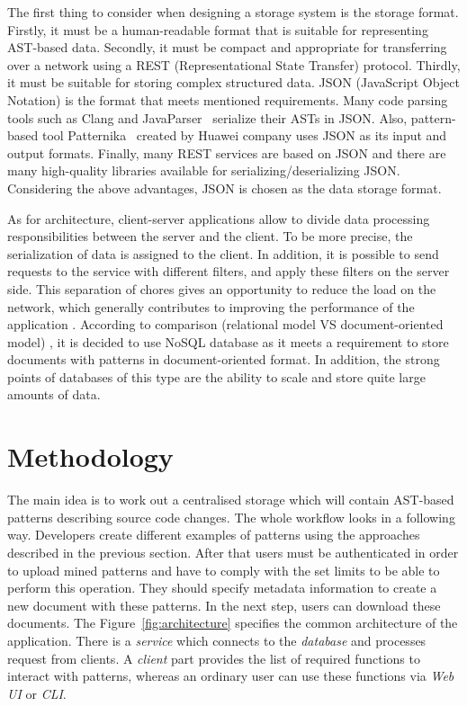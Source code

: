 \documentclass[letterpaper, 10 pt, conference]{ieeeconf}  %
\begin{document}
The first thing to consider when designing a storage system is the storage
format. 
Firstly, it must be a human-readable format that is suitable for
representing AST-based data. 
Secondly, it must be compact and appropriate for transferring over a network 
using a REST (Representational State Transfer) protocol. 
Thirdly, it must be suitable for storing complex structured data.
JSON (JavaScript Object Notation) \cite{c7} is the format that meets mentioned
requirements.
Many code parsing tools such as Clang and JavaParser~\cite{c8} serialize 
their ASTs in JSON. 
Also, pattern-based tool Patternika~\cite{c1} created by Huawei company uses
JSON as its input and output formats.
Finally, many REST services are based on JSON and there are many high-quality
libraries available for serializing/deserializing JSON. 
Considering the above advantages, JSON is chosen as the data storage format.

As for architecture, client-server applications allow to divide data
processing responsibilities between the server and the client. 
To be more precise, the serialization of data is assigned to the client. 
In addition, it is possible to send requests to the service with different
filters, and apply these filters on the server side. 
This separation of chores gives an opportunity to reduce the load on the
network, which generally contributes to improving the performance of the
application \cite{c10}. 
According to comparison (relational model VS document-oriented model)
\cite{c11}, it is decided to use NoSQL database as it meets a requirement 
to store documents with patterns in document-oriented format. 
In addition, the strong points of databases of this type are the ability to
scale and store quite large amounts of data.

\section{Methodology}
\label{section:method}

The main idea is to work out a centralised storage which will contain AST-based
patterns describing source code changes.
The whole workflow looks in a following way.
Developers create different examples of patterns using the approaches described
in the previous section.
After that users must be authenticated in order to upload mined patterns and
have to comply with the set limits to be able to perform this operation.
They should specify metadata information to create a new document with these
patterns.
In the next step, users can download these documents.
The Figure~\ref{fig:architecture} specifies the common architecture of the
application.
There is a \emph{service} which connects to the \emph{database} and processes
request from clients. 
A \emph{client} part provides the list of required functions to interact 
with patterns, whereas an ordinary user can use these functions via 
\emph{Web UI} or \emph{CLI}.
\end{document}
